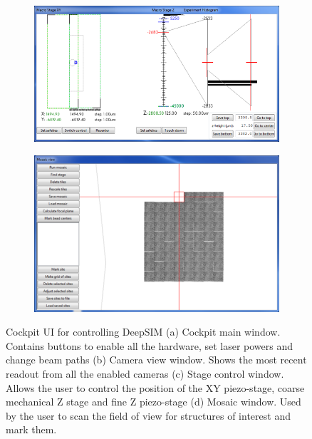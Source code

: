 \begin{figure}[H]
	\begin{subfigure}{0.51\textwidth}
		\centering
		\includegraphics[width=\linewidth]{images/DeepSIM_control_software_stage_control.png}
		\caption{}
		\label{fig:DeepSIM_control_software_stage_control}
	\end{subfigure}
	\begin{subfigure}{0.45\textwidth}
		\centering
		\includegraphics[width=\linewidth]{images/DeepSIM_control_software_mosaic.png}
		\caption{}
		\label{fig:DeepSIM_control_software_mosaic}
	\end{subfigure}
	\caption{Cockpit UI for controlling DeepSIM (a) Cockpit main window. Contains buttons to enable all the hardware, set laser powers and change beam paths (b) Camera view window. Shows the most recent readout from all the enabled cameras (c) Stage control window. Allows the user to control the position of the XY piezo-stage, coarse mechanical Z stage and fine Z piezo-stage (d) Mosaic window. Used by the user to scan the field of view for structures of interest and mark them.}
	\label{fig:Cockpit_UI}
\end{figure}
	
